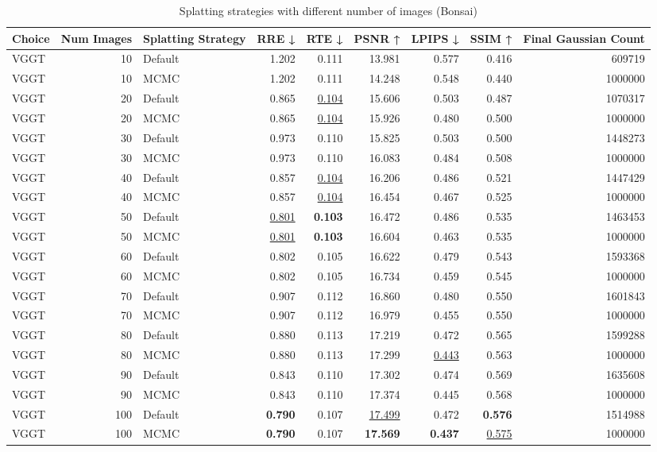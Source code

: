 \begin{table}[H]
\caption{Splatting strategies with different number of images (Bonsai)}
\label{tab:09_splatting_strategy_bonsai}
\begin{tabular}{lrlrrrrrr}
\toprule
Choice & Num Images & Splatting Strategy & RRE ↓ & RTE ↓ & PSNR ↑ & LPIPS ↓ & SSIM ↑ & Final Gaussian Count \\
\midrule
VGGT & 10 & Default & 1.202 & 0.111 & 13.981 & 0.577 & 0.416 & 609719 \\
VGGT & 10 & MCMC & 1.202 & 0.111 & 14.248 & 0.548 & 0.440 & 1000000 \\
VGGT & 20 & Default & 0.865 & \underline{0.104} & 15.606 & 0.503 & 0.487 & 1070317 \\
VGGT & 20 & MCMC & 0.865 & \underline{0.104} & 15.926 & 0.480 & 0.500 & 1000000 \\
VGGT & 30 & Default & 0.973 & 0.110 & 15.825 & 0.503 & 0.500 & 1448273 \\
VGGT & 30 & MCMC & 0.973 & 0.110 & 16.083 & 0.484 & 0.508 & 1000000 \\
VGGT & 40 & Default & 0.857 & \underline{0.104} & 16.206 & 0.486 & 0.521 & 1447429 \\
VGGT & 40 & MCMC & 0.857 & \underline{0.104} & 16.454 & 0.467 & 0.525 & 1000000 \\
VGGT & 50 & Default & \underline{0.801} & \textbf{0.103} & 16.472 & 0.486 & 0.535 & 1463453 \\
VGGT & 50 & MCMC & \underline{0.801} & \textbf{0.103} & 16.604 & 0.463 & 0.535 & 1000000 \\
VGGT & 60 & Default & 0.802 & 0.105 & 16.622 & 0.479 & 0.543 & 1593368 \\
VGGT & 60 & MCMC & 0.802 & 0.105 & 16.734 & 0.459 & 0.545 & 1000000 \\
VGGT & 70 & Default & 0.907 & 0.112 & 16.860 & 0.480 & 0.550 & 1601843 \\
VGGT & 70 & MCMC & 0.907 & 0.112 & 16.979 & 0.455 & 0.550 & 1000000 \\
VGGT & 80 & Default & 0.880 & 0.113 & 17.219 & 0.472 & 0.565 & 1599288 \\
VGGT & 80 & MCMC & 0.880 & 0.113 & 17.299 & \underline{0.443} & 0.563 & 1000000 \\
VGGT & 90 & Default & 0.843 & 0.110 & 17.302 & 0.474 & 0.569 & 1635608 \\
VGGT & 90 & MCMC & 0.843 & 0.110 & 17.374 & 0.445 & 0.568 & 1000000 \\
VGGT & 100 & Default & \textbf{0.790} & 0.107 & \underline{17.499} & 0.472 & \textbf{0.576} & 1514988 \\
VGGT & 100 & MCMC & \textbf{0.790} & 0.107 & \textbf{17.569} & \textbf{0.437} & \underline{0.575} & 1000000 \\
\bottomrule
\end{tabular}
\end{table}
